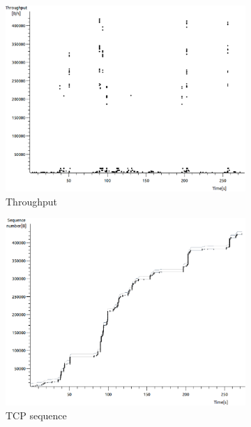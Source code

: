 \documentclass[conference,a4paper]{IEEEtran}
\begin{document}
\begin{figure}
 \centering
 \begin{subfigure}[b]{0.2\textwidth}
  \includegraphics[width=\textwidth]{s2-1_thru}
  \caption{Throughput}
 \end{subfigure}
 \begin{subfigure}[b]{0.2\textwidth}
  \includegraphics[width=\textwidth]{s2-1_seq}
  \caption{TCP sequence}
 \end{subfigure}
 \begin{subfigure}[b]{0.2\textwidth}

\end{subfigure}
\end{figure}
\end{document}

